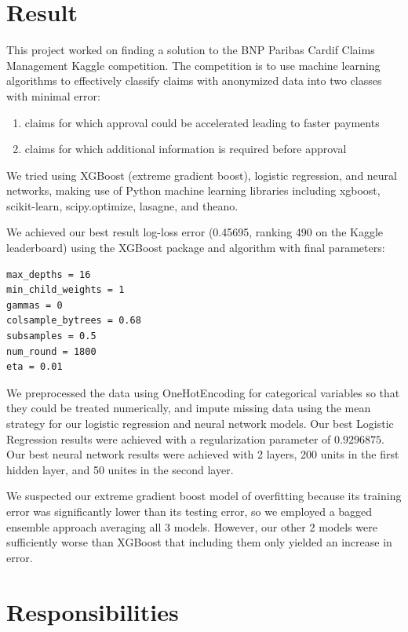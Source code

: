 \documentclass[twoside,11pt]{article}
\theoremstyle{definition}
\begin{document}
\section{Result}
  This project worked on finding a solution to the BNP Paribas Cardif Claims Management Kaggle competition. The competition is to use machine learning algorithms to effectively classify claims with anonymized data into two classes with minimal error:

  \begin{enumerate}
    \item claims for which approval could be accelerated leading to faster payments
    \item claims for which additional information is required before approval
  \end{enumerate}

  We tried using XGBoost (extreme gradient boost), logistic regression, and neural networks, making use of Python machine learning libraries including xgboost, scikit-learn, scipy.optimize, lasagne, and theano.

  We achieved our best result log-loss error (0.45695, ranking 490 on the Kaggle leaderboard) using the XGBoost package and algorithm with final parameters:

  \begin{lstlisting}
max_depths = 16
min_child_weights = 1
gammas = 0
colsample_bytrees = 0.68
subsamples = 0.5
num_round = 1800
eta = 0.01
  \end{lstlisting}

  We preprocessed the data using OneHotEncoding for categorical variables so that they could be treated numerically, and impute missing data using the mean strategy for our logistic regression and neural network models. Our best Logistic Regression results were achieved with a regularization parameter of $0.9296875$. Our best neural network results were achieved with 2 layers, 200 units in the first hidden layer, and 50 unites in the second layer.

  We suspected our extreme gradient boost model of overfitting because its training error was significantly lower than its testing error, so we employed a bagged ensemble approach averaging all 3 models. However, our other 2 models were sufficiently worse than XGBoost that including them only yielded an increase in error.

\section{Responsibilities}
\end{document}
